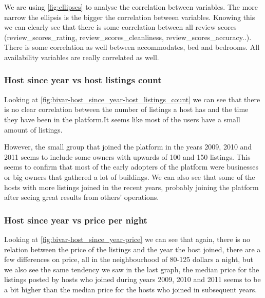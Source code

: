 We are using \cref{fig:ellipses} to analyse the correlation between variables. The more narrow the ellipsis is the bigger the correlation between variables. Knowing this we can clearly see that there is some correlation between all review scores (review\_scores\_rating,
review\_scores\_cleanliness, review\_scores\_accuracy..). There is some correlation as well between accommodates, bed and bedrooms. All availability variables are really correlated as well.
\subsubsection{Host since year vs host listings count}




Looking at \cref{fig:bivar-host_since_year-host_listings_count} we can see that
there is no clear correlation between the number of listings a host has and the
time they have been in the platform.It seems like most of the users have a small
amount of listings.

However, the small group that joined the platform in the years 2009, 2010 and
2011 seems to include some owners with upwards of 100 and 150 listings. This
seems to confirm that most of the early adopters of the platform were businesses
or big owners that gathered a lot of buildings. We can also see that some of the
hosts with more listings joined in the recent years, probably joining the
platform after seeing great results from others' operations.


\pagebreak
\subsubsection{Host since year vs price per night}


Looking at \cref{fig:bivar-host_since_year-price} we can see that again, there
is no relation between the price of the listings and the year the host joined,
there are a few differences on price, all in the neighbourhood of 80-125 dollars
a night, but we also see the same tendency we saw in the last graph, the median
price for the listings posted by hosts who joined during years 2009, 2010 and
2011 seems to be a bit higher than the median price for the hosts who joined in
subsequent years.

